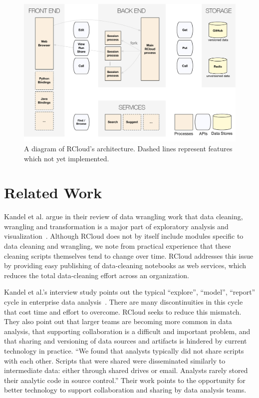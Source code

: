 \begin{figure}
\includegraphics[width=\linewidth]{fig/system/system.pdf}
\caption{\label{fig:system}A diagram of RCloud's architecture. Dashed
  lines represent features which not yet implemented. }
\end{figure}

\section{Related Work}


Kandel et al. argue in their review of data wrangling work that data
cleaning, wrangling and transformation is a major part of exploratory
analysis and visualization~\cite{Kandel:2011:RDI}. Although RCloud
does not by itself include modules specific to data cleaning and
wrangling, we note from practical experience that these cleaning
scripts themselves tend to change over time. RCloud addresses this
issue by providing easy publishing of data-cleaning notebooks as web
services, which reduces the total data-cleaning effort across an
organization.

Kandel et al.'s interview study points out the typical ``explore'',
``model'', ``report'' cycle in enterprise data
analysis~\cite{Kandel:2012:EDA}. There are many discontinuities in
this cycle that cost time and effort to overcome. RCloud seeks to
reduce this mismatch. They also point out that larger teams
are becoming more common in data analysis, that supporting
collaboration is a difficult and important problem, and that sharing
and versioning of data sources and artifacts is hindered by current
technology in practice. ``We found that analysts typically did not
share scripts with each other. Scripts that were shared were
disseminated similarly to intermediate data: either through shared
drives or email. Analysts rarely stored their analytic code in source
control.'' Their work points to the opportunity for better technology
to support collaboration and sharing by data analysis teams.

